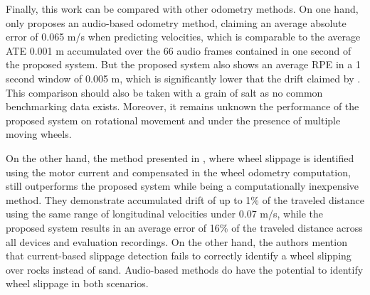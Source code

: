 Finally, this work can be compared with other odometry methods. On one hand,
only \cite{marchegiani2018a} proposes an audio-based odometry method, claiming
an average absolute error of 0.065 m/s when predicting velocities, which is
comparable to the average ATE 0.001 m accumulated over the 66 audio frames
contained in one second of the proposed system. But the proposed system also
shows an average RPE in a 1 second window of 0.005 m, which is significantly
lower that the drift claimed by \citeauthor{marchegiani2018a}. This comparison should
also be taken with a grain of salt as no common benchmarking data exists.
Moreover, it remains unknown the performance of the proposed system on
rotational movement and under the presence of multiple moving wheels.

On the other hand, the method presented in \cite{Ojeda2006}, where wheel
slippage is identified using the motor current and compensated in the wheel
odometry computation, still outperforms the proposed system while being a
computationally inexpensive method. They demonstrate accumulated drift of up to
1\% of the traveled distance using the same range of longitudinal velocities
under 0.07 m/s, while the proposed system results in an average error of
16\% of the traveled distance across all devices and evaluation recordings.
On the other hand, the authors mention that current-based slippage detection
fails to correctly identify a wheel slipping over rocks instead of sand.
Audio-based methods do have the potential to identify wheel slippage in both
scenarios.